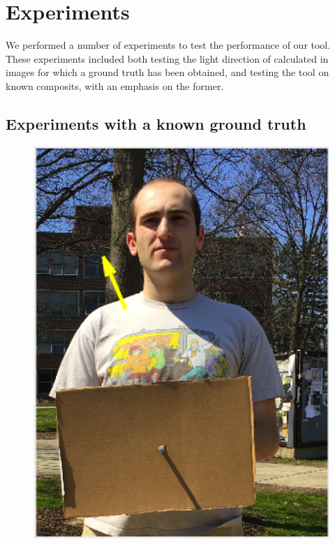 \documentclass[10pt,twocolumn,letterpaper]{article}
\begin{document}
\section{Experiments}
We performed a number of experiments to test the performance of our tool. These experiments included both testing the light direction of calculated in images for which a ground truth has been obtained, and testing the tool on known composits, with an emphasis on the former.
\subsection{Experiments with a known ground truth}
\begin{figure}[h]
\center
\includegraphics[scale = 0.3]{nathan.png}

\end{figure}
\end{document}

